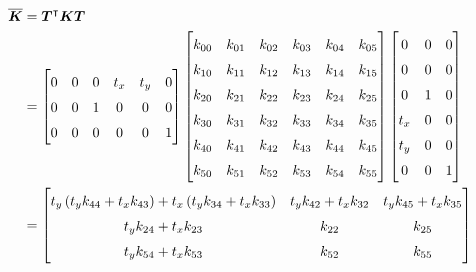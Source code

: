 \begin{align}
\overline{\boldsymbol{K}} &= \boldsymbol{T}^\intercal\boldsymbol{K}\boldsymbol{T} \notag \\
&=
\begin{bmatrix}
0 & 0 & 0 & t_x & t_y & 0 \\
0 & 0 & 1 & 0 & 0 & 0 \\
0 & 0 & 0 & 0 & 0 & 1 \\
\end{bmatrix}
\begin{bmatrix}
k_{00} & k_{01} & k_{02} & k_{03} & k_{04} & k_{05} \\
k_{10} & k_{11} & k_{12} & k_{13} & k_{14} & k_{15} \\
k_{20} & k_{21} & k_{22} & k_{23} & k_{24} & k_{25} \\
k_{30} & k_{31} & k_{32} & k_{33} & k_{34} & k_{35} \\
k_{40} & k_{41} & k_{42} & k_{43} & k_{44} & k_{45} \\
k_{50} & k_{51} & k_{52} & k_{53} & k_{54} & k_{55} \\
\end{bmatrix}
\begin{bmatrix}
0 & 0 & 0 \\
0 & 0 & 0 \\
0 & 1 & 0 \\
t_x & 0 & 0 \\
t_y & 0 & 0 \\
0 & 0 & 1 \\
\end{bmatrix} \notag \\
&=
\renewcommand\arraystretch{1.5}
\begin{bmatrix}
t_y \left(t_y k_{44} + t_x k_{43}\right) + t_x \left(t_y k_{34} + t_x k_{33}\right) & t_y k_{42} + t_x k_{32} & t_y k_{45} + t_x k_{35} \\
t_y k_{24} + t_x k_{23} & k_{22} & k_{25} \\
t_y k_{54} + t_x k_{53} & k_{52} & k_{55} \\
\end{bmatrix}
\end{align}

